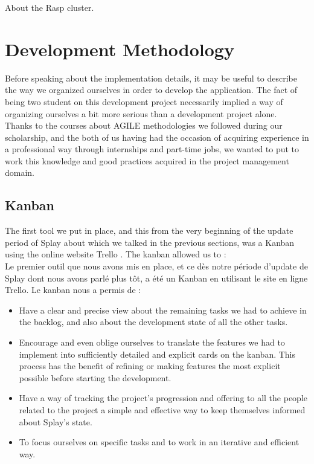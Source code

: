 \documentclass{eplmastersthesis}
\begin{document}
      About the Rasp cluster.

  \chapter{Development Methodology}

    Before speaking about the implementation details, it may be useful to
    describe the way we organized ourselves in order to develop the application.
    The fact of being two student on this development project necessarily
    implied a way of organizing ourselves a bit more serious than a
    development project alone.\\

    Thanks to the courses about AGILE methodologies we followed during our
    scholarship, and the both of us having had the occasion of acquiring
    experience in a professional way through internships and part-time jobs,
    we wanted to put to work this knowledge and good practices acquired in
    the project management domain.\\

      \section{Kanban}

        The first tool we put in place, and this from the very beginning of
        the update period of Splay about which we talked in the previous
        sections, was a Kanban using the online website Trello \cite{trello}.
        The kanban allowed us to : \\

        Le premier outil que nous avons mis en place, et ce dès notre période
        d'update de Splay dont nous avons parlé plus tôt, a été un Kanban en
        utilisant le site en ligne Trello. Le kanban nous a permis de : \\

        \begin{itemize}
          \item Have a clear and precise view about the remaining tasks we had
          to achieve in the backlog, and also about the development state of
          all the other tasks.
          \item Encourage and even oblige ourselves to translate the features
          we had to implement into sufficiently detailed and explicit cards on
          the kanban. This process has the benefit of refining or making
          features the most explicit possible before starting the development.
          \item Have a way of tracking the project's progression and offering
          to all the people related to the project a simple and effective way
          to keep themselves informed about Splay's state.
          \item To focus ourselves on specific tasks and to work in an
          iterative and efficient way.
        \end{itemize}
\end{document}
